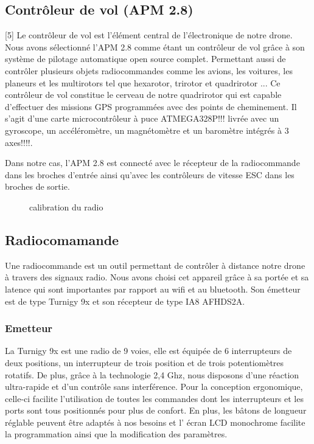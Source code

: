 \documentclass[a4paper,12pt]{book}
\begin{document}
\subsection {Contrôleur de vol (APM 2.8)}[5]
 Le contrôleur de vol est l'élément central de l'électronique de notre drone.
Nous avons sélectionné l’APM 2.8 comme étant un contrôleur de vol grâce à son système de pilotage automatique open source complet. Permettant aussi de contrôler plusieurs objets radiocommandes comme les avions, les voitures, les planeurs et les multirotors tel que hexarotor, trirotor et quadrirotor ...
Ce contrôleur de vol constitue le cerveau de notre quadrirotor qui est capable d'effectuer des missions GPS programmées avec des points de cheminement. Il s’agit d’une carte microcontrôleur à puce ATMEGA328P!!! livrée avec un gyroscope, un accéléromètre, un magnétomètre et un baromètre intégrés à 3 axes!!!!.

Dans notre cas, l’APM 2.8 est connecté avec le récepteur de la radiocommande dans les broches d’entrée ainsi qu'avec les contrôleurs de vitesse ESC dans les broches de sortie. 
 
	\begin{figure} [h]
	\begin{center}
		\centering
{}
	\end{center}
	\caption{calibration du radio}
\end{figure}
\newpage
\subsection {Radiocomamande}
Une radiocommande est un outil permettant de contrôler à distance notre drone à travers des signaux radio. Nous avons choisi cet appareil grâce à sa portée et sa latence qui sont importantes par rapport au wifi et au bluetooth. Son émetteur est de type Turnigy 9x et son récepteur de type IA8 AFHDS2A.

\subsubsection{Emetteur} 
La Turnigy 9x est une radio de 9 voies, elle est équipée de 6 interrupteurs de deux positions, un interrupteur de trois position et de trois potentiomètres rotatifs.
De plus, grâce à la technologie 2,4 Ghz, nous disposons d'une réaction ultra-rapide et d'un contrôle sans interférence. Pour la
conception ergonomique, celle-ci facilite l'utilisation de toutes les commandes dont les interrupteurs et les ports sont tous positionnés pour plus de confort. En plus, les bâtons de longueur réglable peuvent être adaptés à nos besoins et l' écran LCD monochrome facilite la programmation ainsi que la modification des paramètres. 
\end{document}
